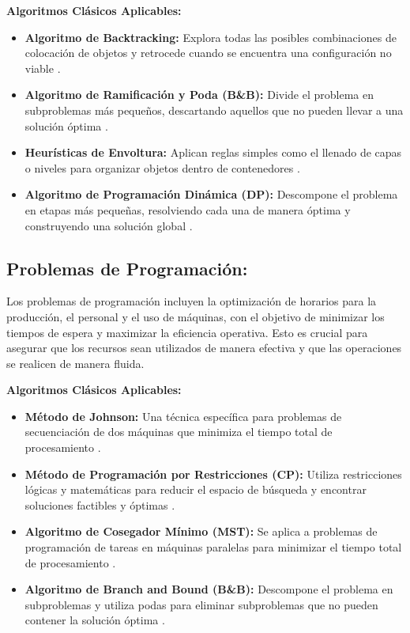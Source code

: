 \documentclass[11pt,a4paper,spanish]{book}
\begin{document}
	\textbf{Algoritmos Clásicos Aplicables:}
	\begin{itemize}
		\item \textbf{Algoritmo de Backtracking:} Explora todas las posibles combinaciones de colocación de objetos y retrocede cuando se encuentra una configuración no viable \cite{lawler1985knapsack}.
		\item \textbf{Algoritmo de Ramificación y Poda (B\&B):} Divide el problema en subproblemas más pequeños, descartando aquellos que no pueden llevar a una solución óptima \cite{lawler1966branch}.
		\item \textbf{Heurísticas de Envoltura:} Aplican reglas simples como el llenado de capas o niveles para organizar objetos dentro de contenedores \cite{coffman1978application}.
		\item \textbf{Algoritmo de Programación Dinámica (DP):} Descompone el problema en etapas más pequeñas, resolviendo cada una de manera óptima y construyendo una solución global \cite{bellman1966dynamic}.
	\end{itemize}
	
\subsection{Problemas de Programación:} 
	
	Los problemas de programación incluyen la optimización de horarios para la producción, el personal y el uso de máquinas, con el objetivo de minimizar los tiempos de espera y maximizar la eficiencia operativa. Esto es crucial para asegurar que los recursos sean utilizados de manera efectiva y que las operaciones se realicen de manera fluida.
	
	\textbf{Algoritmos Clásicos Aplicables:}
	\begin{itemize}
		\item \textbf{Método de Johnson:} Una técnica específica para problemas de secuenciación de dos máquinas que minimiza el tiempo total de procesamiento \cite{johnson1954optimal}.
		\item \textbf{Método de Programación por Restricciones (CP):} Utiliza restricciones lógicas y matemáticas para reducir el espacio de búsqueda y encontrar soluciones factibles y óptimas \cite{rossi2006handbook}.
		\item \textbf{Algoritmo de Cosegador Mínimo (MST):} Se aplica a problemas de programación de tareas en máquinas paralelas para minimizar el tiempo total de procesamiento \cite{graham1966bounds}.
		\item \textbf{Algoritmo de Branch and Bound (B\&B):} Descompone el problema en subproblemas y utiliza podas para eliminar subproblemas que no pueden contener la solución óptima \cite{lawler1966branch}.
	\end{itemize}
\end{document}
